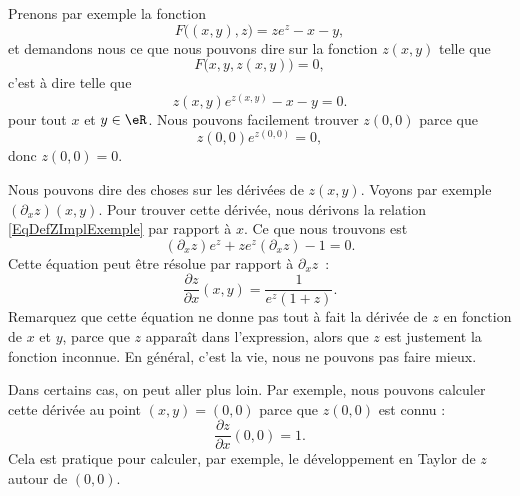 Prenons par exemple la fonction
\begin{equation}
	F\big( (x,y),z \big)=ze^z-x-y,
\end{equation}
et demandons nous ce que nous pouvons dire sur la fonction $z(x,y)$ telle que
\begin{equation}
	F\big( x,y,z(x,y) \big)=0,
\end{equation}
c'est à dire telle que
\begin{equation}		\label{EqDefZImplExemple}
	z(x,y) e^{z(x,y)}-x-y=0.
\end{equation}
pour tout $x$ et $y\in\eR$. Nous pouvons facilement trouver $z(0,0)$ parce que
\begin{equation}
	z(0,0) e^{z(0,0)}=0,
\end{equation}
donc $z(0,0)=0$.

Nous pouvons dire des choses sur les dérivées de $z(x,y)$. Voyons par exemple $(\partial_xz)(x,y)$. Pour trouver cette dérivée, nous dérivons la relation \eqref{EqDefZImplExemple} par rapport à $x$. Ce que nous trouvons est
\begin{equation}
	(\partial_xz)e^z+ze^z(\partial_xz)-1=0.
\end{equation}
Cette équation peut être résolue par rapport à $\partial_xz$~:
\begin{equation}
	\frac{ \partial z }{ \partial x }(x,y)=\frac{1}{ e^z(1+z) }.
\end{equation}
Remarquez que cette équation ne donne pas tout à fait la dérivée de $z$ en fonction de $x$ et $y$, parce que $z$ apparaît dans l'expression, alors que $z$ est justement la fonction inconnue. En général, c'est la vie, nous ne pouvons pas faire mieux.

Dans certains cas, on peut aller plus loin. Par exemple, nous pouvons calculer cette dérivée au point $(x,y)=(0,0)$ parce que $z(0,0)$ est connu :
\begin{equation}
	\frac{ \partial z }{ \partial x }(0,0)=1.
\end{equation}
Cela est pratique pour calculer, par exemple, le développement en Taylor de $z$ autour de $(0,0)$.


